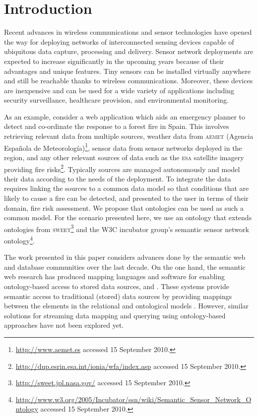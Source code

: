 \section{Introduction}
\label{intro}

Recent advances in wireless communications and sensor technologies have opened the way for deploying networks of interconnected sensing devices capable of ubiquitous data capture, processing and delivery.
Sensor network deployments are expected to increase significantly in the upcoming years because of their advantages and unique features.
Tiny sensors can be installed virtually anywhere and still be reachable thanks to wireless communications. 
Moreover, these devices are inexpensive and can be used for a wide variety of applications including security surveillance, healthcare provision, and environmental monitoring.

As an example, consider a web application which aids an emergency planner to detect and co-ordinate the response to a forest fire in Spain. 
This involves retrieving relevant data from multiple sources, \eg weather data from \textsc{aemet} (Agencia Espa\~nola de Meteorolog\'ia)\footnote{\url{http://www.aemet.es} accessed 15 September 2010.}, sensor data from sensor networks deployed in the region, and any other relevant sources of data such as the \textsc{esa} satellite imagery providing fire risks\footnote{\url{http://dup.esrin.esa.int/ionia/wfa/index.asp} accessed 15 September 2010.}. 
Typically sources are managed autonomously and model their data according to the needs of the deployment. 
To integrate the data requires linking the sources to a common data model so that conditions that are likely to cause a fire can be detected, and presented to the user in terms of their domain, \eg fire risk assessment. 
We propose that ontologies can be used as such a common model. 
For the scenario presented here, we use an ontology that extends ontologies from \textsc{sweet}\footnote{\url{http://sweet.jpl.nasa.gov/} accessed 15 September 2010.} and the W3C incubator group's semantic sensor network ontology\footnote{\url{http://www.w3.org/2005/Incubator/ssn/wiki/Semantic_Sensor_Network_Ontology} accessed 15 September 2010.}.

The work presented in this paper considers advances done by the semantic web and database communities over the last decade. On the one hand, the semantic web research has produced mapping languages and software for enabling ontology-based access to stored data sources, \eg \rtwoo \cite{Barrasa_04} and \dtworq \cite{Bizer_07}.
These systems provide semantic access to traditional (stored) data sources by providing mappings between the elements in the relational and ontological models \cite{Sahoo_09}.
However, similar solutions for streaming data mapping and querying using ontology-based approaches have not been explored yet.

